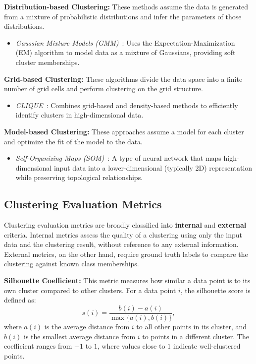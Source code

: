 \textbf{Distribution-based Clustering:}
These methods assume the data is generated from a mixture of probabilistic
distributions and infer the parameters of those distributions.
\begin{itemize}
    \item \emph{Gaussian Mixture Models (GMM)}~\cite{gaussian_mixtures}: Uses the Expectation-Maximization (EM)
          algorithm to model data as a mixture of Gaussians, providing soft cluster memberships.
\end{itemize}

\textbf{Grid-based Clustering:}
These algorithms divide the data space into a finite number of grid cells
and perform clustering on the grid structure.
\begin{itemize}
    \item \emph{CLIQUE}~\cite{clique}: Combines grid-based and density-based methods
          to efficiently identify clusters in high-dimensional data.
\end{itemize}

\textbf{Model-based Clustering:}
These approaches assume a model for each cluster and optimize the fit of the model to the data.
\begin{itemize}
    \item \emph{Self-Organizing Maps (SOM)}~\cite{som}: A type of neural network that
          maps high-dimensional input data into a lower-dimensional (typically 2D)
          representation while preserving topological relationships.
\end{itemize}

\subsection*{Clustering Evaluation Metrics}

Clustering evaluation metrics are broadly classified into \textbf{internal} and
\textbf{external} criteria. Internal metrics assess the quality of a clustering
using only the input data and the clustering result, without reference to any
external information. External metrics, on the other hand, require ground truth
labels to compare the clustering against known class memberships.

\textbf{Silhouette Coefficient:} This metric measures how similar a data point is to
its own cluster compared to other clusters. For a data point $i$, the silhouette score
is defined as:
\begin{equation}
    s(i) = \frac{b(i) - a(i)}{\max\{a(i), b(i)\}},
\end{equation}
where $a(i)$ is the average distance from $i$ to all other points in its
cluster, and $b(i)$ is the smallest average distance from $i$ to points in a
different cluster. The coefficient ranges from $-1$ to $1$, where values close
to $1$ indicate well-clustered points.

